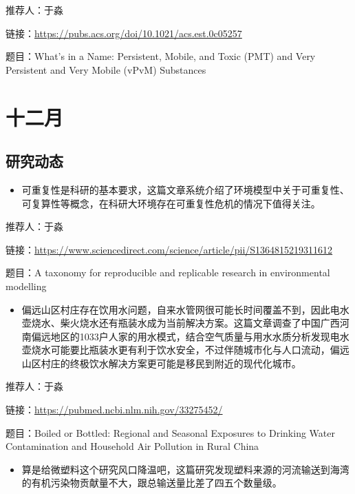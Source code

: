 \documentclass[
]{book}
\providecommand{\tightlist}{%
  \setlength{\itemsep}{0pt}\setlength{\parskip}{0pt}}
\begin{document}
推荐人：于淼

链接：\url{https://pubs.acs.org/doi/10.1021/acs.est.0c05257}

题目：What's in a Name: Persistent, Mobile, and Toxic (PMT) and Very Persistent and Very Mobile (vPvM) Substances

\hypertarget{ux5341ux4e8cux6708-3}{%
\section*{十二月}\label{ux5341ux4e8cux6708-3}}

\hypertarget{ux7814ux7a76ux52a8ux6001-37}{%
\subsection*{研究动态}\label{ux7814ux7a76ux52a8ux6001-37}}

\begin{itemize}
\tightlist
\item
  可重复性是科研的基本要求，这篇文章系统介绍了环境模型中关于可重复性、可复算性等概念，在科研大环境存在可重复性危机的情况下值得关注。
\end{itemize}

推荐人：于淼

链接：\url{https://www.sciencedirect.com/science/article/pii/S1364815219311612}

题目：A taxonomy for reproducible and replicable research in environmental modelling

\begin{itemize}
\tightlist
\item
  偏远山区村庄存在饮用水问题，自来水管网很可能长时间覆盖不到，因此电水壶烧水、柴火烧水还有瓶装水成为当前解决方案。这篇文章调查了中国广西河南偏远地区的1033户人家的用水模式，结合空气质量与用水水质分析发现电水壶烧水可能要比瓶装水更有利于饮水安全，不过伴随城市化与人口流动，偏远山区村庄的终极饮水解决方案更可能是移民到附近的现代化城市。
\end{itemize}

推荐人：于淼

链接：\url{https://pubmed.ncbi.nlm.nih.gov/33275452/}

题目：Boiled or Bottled: Regional and Seasonal Exposures to Drinking Water Contamination and Household Air Pollution in Rural China

\begin{itemize}
\tightlist
\item
  算是给微塑料这个研究风口降温吧，这篇研究发现塑料来源的河流输送到海湾的有机污染物贡献量不大，跟总输送量比差了四五个数量级。
\end{itemize}
\end{document}
